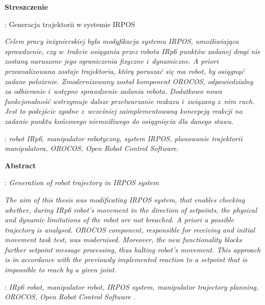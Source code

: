 
\newpage
\thispagestyle{empty}
\fontsize{12}{12}\selectfont
\vspace*{2\baselineskip}
\begin{center}
	{\large\bfseries Streszczenie}\par\bigskip
\end{center}

: {Generacja trajektorii w systemie IRPOS}\par
\vspace*{0.5\baselineskip}

{\itshape
Celem pracy inżynierskiej była modyfikacja systemu IRPOS, umożliwiająca sprawdzenie, czy w~trakcie osiągania przez robota IRp6 punktów zadanej drogi nie zostaną naruszone jego ograniczenia fizyczne i~dynamiczne. A priori przeanalizowana zostaje trajektoria, którą poruszać się ma robot, by osiągnąć zadane położenie.
Zmodernizowany został komponent OROCOS, odpowiedzialny za odbieranie i~wstępne sprawdzenie zadania robota.
Dodatkowo nowa funkcjonalność wstrzymuje dalsze przetwarzanie rozkazu i~związany z~nim ruch. Jest to podejście zgodne z~wcześniej zaimplementowaną koncepcją reakcji na zadanie punktu końcowego niemożliwego do osiągnięcia dla danego stawu.
}

\vspace*{0.5\baselineskip}
: {\itshape robot IRp6, manipulator robotyczny, system IRPOS, planowanie trajektorii manipulatora, OROCOS, Open Robot Control Software.
	}

\par
\vspace{0\baselineskip}
\begin{center}
	{\large\bfseries Abstract}\par\bigskip
\end{center}

: {\itshape Generation of robot trajectory in IRPOS system}\par
\vspace*{0.5\baselineskip}

{\itshape
	The aim of this thesis was modificating IRPOS system, that enables checking whether, during IRp6 robot's movement in the direction of setpoints, the physical and dynamic limitations of the robot are not breached. A priori a possible trajectory is analysed. OROCOS component, responsible for receiving and initial movement task test, was modernised.  Moreover, the new functionality blocks further setpoint message processing, thus halting robot's movement. This approach is in accordance with the previously implemented reaction to a setpoint that is impossible to reach by a given joint.
}

\vspace*{0.5\baselineskip}
: {\itshape IRp6 robot, manipulator robot, IRPOS system, manipulator trajectory planning, OROCOS, Open Robot Control Software .}%

\newpage
\thispagestyle{empty}
\mbox{}